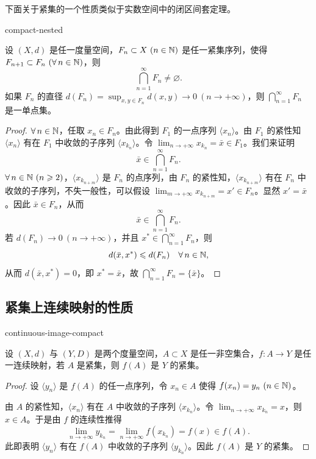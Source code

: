下面关于紧集的一个性质类似于实数空间中的闭区间套定理。

\begin{mythm}{}{compact-nested}

设 $(X,d)$ 是任一度量空间，$F_n\subset X\ (n\in\N)$ 是任一紧集序列，使得 $F_{n+1}\subset F_n\ (\forall\,n\in\mathbb{N})$，则
\[\bigcap_{n=1}^{\infty}F_n\neq\varnothing.\]
如果 $F_n$ 的直径 $d(F_n)=\displaystyle\sup_{x,y\in F_n}d(x,y)\to0\ (n\to+\infty)$，则 $\displaystyle\bigcap_{n=1}^{\infty}F_n$ 是一单点集。

\end{mythm}

\begin{proof}

$\forall\,n\in\mathbb{N}$，任取 $x_n\in F_n$。由此得到 $F_1$ 的一点序列 $\langle x_n\rangle$。由 $F_1$ 的紧性知 $\langle x_n\rangle$ 有在 $F_1$ 中收敛的子序列 $\langle x_{k_n}\rangle$。令 $\displaystyle\lim_{n\to+\infty}x_{k_n}=\bar x\in F_1$。我们来证明
\[\bar x\in\bigcap_{n=1}^{\infty}F_n.\]
$\forall\,n\in\N\ (n\geqslant2)$，$\langle x_{k_{n+m}}\rangle$ 是 $F_n$ 的点序列，由 $F_n$ 的紧性知，$\langle x_{k_{n+m}}\rangle$ 有在 $F_n$ 中收敛的子序列，不失一般性，可以假设 $\displaystyle\lim_{m\to+\infty}x_{k_{n+m}}=x'\in F_n$。显然 $x'=\bar x$。因此 $\bar x\in F_n$，从而
\[\bar x\in\bigcap_{n=1}^{\infty}F_n.\]
若 $d(F_n)\to0\ (n\to+\infty)$，并且 $x^*\in\displaystyle\bigcap_{n=1}^{\infty}F_n$，则
\[d(\bar x,x^*)\leqslant d(F_n)\quad\forall\,n\in\mathbb{N},\]
从而 $d(\bar x,x^*)=0$，即 $x^*=\bar x$，故 $\displaystyle\bigcap_{n=1}^{\infty}F_n=\{\bar x\}$。

\end{proof}

\subsection{紧集上连续映射的性质}

\begin{mythm}{}{continuous-image-compact}

设 $(X,d)$ 与 $(Y,D)$ 是两个度量空间，$A\subset X$ 是任一非空集合，$f:A\to Y$ 是任一连续映射，若 $A$ 是紧集，则 $f(A)$ 是 $Y$ 的紧集。

\end{mythm}

\begin{proof}

设 $\langle y_n\rangle$ 是 $f(A)$ 的任一点序列，令 $x_n\in A$ 使得 $f(x_n)=y_n\ (n\in\mathbb{N})$。

由 $A$ 的紧性知，$\langle x_n\rangle$ 有在 $A$ 中收敛的子序列 $\langle x_{k_n}\rangle$。令 $\displaystyle\lim_{n\to+\infty}x_{k_n}=x$，则 $x\in A$。于是由 $f$ 的连续性推得
\[\lim_{n\to+\infty}y_{k_n}=\lim_{n\to+\infty}f(x_{k_n})=f(x)\in f(A).\]
此即表明 $\langle y_n\rangle$ 有在 $f(A)$ 中收敛的子序列 $\langle y_{k_n}\rangle$。因此 $f(A)$ 是 $Y$ 的紧集。

\end{proof}

